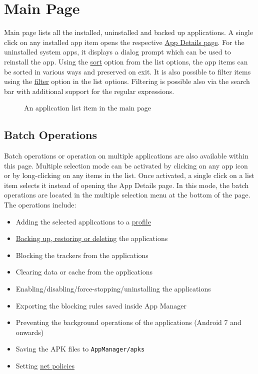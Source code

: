 \section{Main Page}\label{sec:main-page} %
Main page lists all the installed, uninstalled and backed up applications. A single click on any installed app item
opens the respective \hyperref[sec:app-details-page]{App Details page}. For the uninstalled system apps, it displays a
dialog prompt which can be used to reinstall the app. Using the \hyperlink{par:main-page-sort}{sort} option from the
list options, the app items can be sorted in various ways and preserved on exit. It is also possible to filter items
using the \hyperlink{par:main-page-filter}{filter} option in the list options. Filtering is possible also via the search
bar with additional support for the regular expressions.

\begin{figure}[ht]
    \centering
    
    \caption{An application list item in the main page} %
    \label{fig:main_page_entry_info_labeled}
\end{figure}

\subsection{Batch Operations}\label{subsec:batch-operations} %
Batch operations or operation on multiple applications are also available within this page. Multiple selection mode can
be activated by clicking on any app icon or by long-clicking on any items in the list. Once activated, a single click on
a list item selects it instead of opening the App Details page. In this mode, the batch operations are located in the
multiple selection menu at the bottom of the page. The operations include:
\begin{itemize}
    \item Adding the selected applications to a \hyperref[sec:profiles-page]{profile}
    \item \hyperref[sec:backup-restore]{Backing up, restoring or deleting} the applications
    \item Blocking the trackers from the applications
    \item Clearing data or cache from the applications
    \item Enabling/disabling/force-stopping/uninstalling the applications
    \item Exporting the blocking rules saved inside App Manager
    \item Preventing the background operations of the applications (Android 7 and onwards)
    \item Saving the APK files to \texttt{AppManager/apks}
    \item Setting \hyperref[sec:net-policy]{net policies}
\end{itemize}

